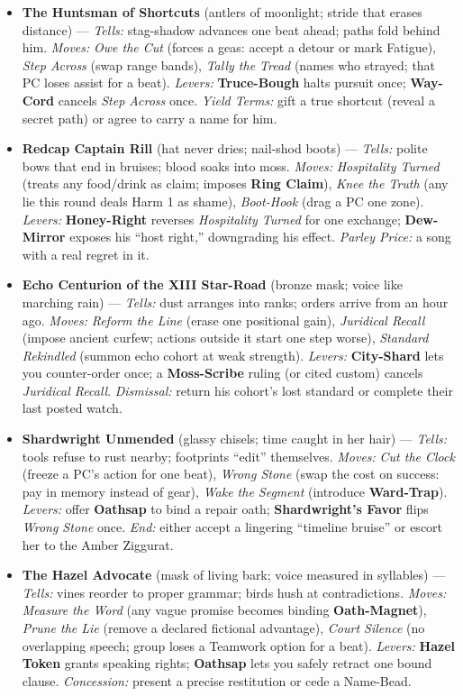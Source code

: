 \begin{itemize}
  \item \textbf{The Huntsman of Shortcuts} (antlers of moonlight; stride that erases distance) --- \emph{Tells:} stag-shadow advances one beat ahead; paths fold behind him. \emph{Moves:} \emph{Owe the Cut} (forces a geas: accept a detour or mark Fatigue), \emph{Step Across} (swap range bands), \emph{Tally the Tread} (names who strayed; that PC loses assist for a beat). \emph{Levers:} \textbf{Truce-Bough} halts pursuit once; \textbf{Way-Cord} cancels \emph{Step Across} once. \emph{Yield Terms:} gift a true shortcut (reveal a secret path) or agree to carry a name for him.
  \item \textbf{Redcap Captain Rill} (hat never dries; nail-shod boots) --- \emph{Tells:} polite bows that end in bruises; blood soaks into moss. \emph{Moves:} \emph{Hospitality Turned} (treats any food/drink as claim; imposes \textbf{Ring Claim}), \emph{Knee the Truth} (any lie this round deals Harm 1 as shame), \emph{Boot-Hook} (drag a PC one zone). \emph{Levers:} \textbf{Honey-Right} reverses \emph{Hospitality Turned} for one exchange; \textbf{Dew-Mirror} exposes his “host right,” downgrading his effect. \emph{Parley Price:} a song with a real regret in it.
  \item \textbf{Echo Centurion of the XIII Star-Road} (bronze mask; voice like marching rain) --- \emph{Tells:} dust arranges into ranks; orders arrive from an hour ago. \emph{Moves:} \emph{Reform the Line} (erase one positional gain), \emph{Juridical Recall} (impose ancient curfew; actions outside it start one step worse), \emph{Standard Rekindled} (summon echo cohort at weak strength). \emph{Levers:} \textbf{City-Shard} lets you counter-order once; a \textbf{Moss-Scribe} ruling (or cited custom) cancels \emph{Juridical Recall}. \emph{Dismissal:} return his cohort’s lost standard or complete their last posted watch.
  \item \textbf{Shardwright Unmended} (glassy chisels; time caught in her hair) --- \emph{Tells:} tools refuse to rust nearby; footprints “edit” themselves. \emph{Moves:} \emph{Cut the Clock} (freeze a PC’s action for one beat), \emph{Wrong Stone} (swap the cost on success: pay in memory instead of gear), \emph{Wake the Segment} (introduce \textbf{Ward-Trap}). \emph{Levers:} offer \textbf{Oathsap} to bind a repair oath; \textbf{Shardwright’s Favor} flips \emph{Wrong Stone} once. \emph{End:} either accept a lingering “timeline bruise” or escort her to the Amber Ziggurat.
  \item \textbf{The Hazel Advocate} (mask of living bark; voice measured in syllables) --- \emph{Tells:} vines reorder to proper grammar; birds hush at contradictions. \emph{Moves:} \emph{Measure the Word} (any vague promise becomes binding \textbf{Oath-Magnet}), \emph{Prune the Lie} (remove a declared fictional advantage), \emph{Court Silence} (no overlapping speech; group loses a Teamwork option for a beat). \emph{Levers:} \textbf{Hazel Token} grants speaking rights; \textbf{Oathsap} lets you safely retract one bound clause. \emph{Concession:} present a precise restitution or cede a Name-Bead.

\end{itemize}
